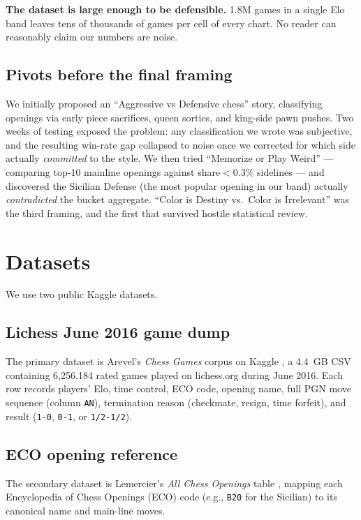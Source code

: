 \documentclass[sigconf,nonacm,natbib=false]{acmart}
\begin{document}
\textbf{The dataset is large enough to be defensible.} 1.8M games
in a single Elo band leaves tens of thousands of games per cell of
every chart. No reader can reasonably claim our numbers are noise.

\subsection{Pivots before the final framing}

We initially proposed an ``Aggressive vs Defensive chess'' story,
classifying openings via early piece sacrifices, queen sorties, and
king-side pawn pushes. Two weeks of testing exposed the problem: any
classification we wrote was subjective, and the resulting win-rate
gap collapsed to noise once we corrected for which side actually
\emph{committed} to the style. We then tried ``Memorize or Play
Weird'' --- comparing top-10 mainline openings against share$<0.3\%$
sidelines --- and discovered the Sicilian Defense (the most popular
opening in our band) actually \emph{contradicted} the bucket
aggregate. ``Color is Destiny vs.\ Color is Irrelevant'' was the
third framing, and the first that survived hostile statistical
review.

\section{Datasets}

We use two public Kaggle datasets.

\subsection{Lichess June 2016 game dump}
The primary dataset is Arevel's \emph{Chess Games} corpus on Kaggle
\cite{kaggle-lichessgames}, a 4.4~GB CSV containing 6{,}256{,}184
rated games played on lichess.org during June 2016. Each row
records players' Elo, time control, ECO code, opening name, full
PGN move sequence (column \texttt{AN}), termination reason
(checkmate, resign, time forfeit), and result (\texttt{1-0},
\texttt{0-1}, or \texttt{1/2-1/2}).

\subsection{ECO opening reference}
The secondary dataset is Lemercier's \emph{All Chess Openings}
table \cite{kaggle-eco}, mapping each Encyclopedia of Chess
Openings (ECO) code (e.g., \texttt{B20} for the Sicilian) to its
canonical name and main-line moves.
\end{document}
